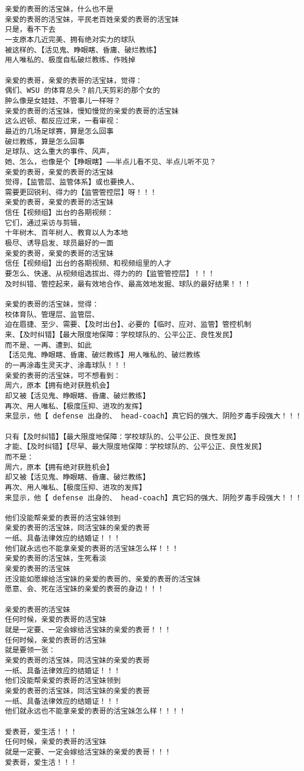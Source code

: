 \documentclass[9pt, b5paper]{article}
\begin{document}
\begin{verbatim}
亲爱的表哥的活宝妹，什么也不是
亲爱的表哥的活宝妹，平民老百姓亲爱的表哥的活宝妹
只是，看不下去
一支原本几近完美、拥有绝对实力的球队
被这样的、【活见鬼、睁眼瞎、昏庸、破烂教练】
用人唯私的、极度自私破烂教练、作贱掉

亲爱的表哥，亲爱的表哥的活宝妹，觉得：
偶们、WSU 的体育总头？前几天剪彩的那个女的
肿么像是女娃娃、不管事儿一样呀？
亲爱的表哥的活宝妹，慢知慢觉的亲爱的表哥的活宝妹
这么迟顿、都反应过来，一看审视：
最近的几场足球赛，算是怎么回事
破烂教练，算是怎么回事
足球队、这么重大的事件、风声，
她、怎么，也像是个【睁眼瞎】——半点儿看不见、半点儿听不见？
亲爱的表哥，亲爱的表哥的活宝妹
觉得，【监管层、监管体系】或也要换人、
需要更回锐利、得力的【监管管控层】呀！！！
亲爱的表哥，亲爱的表哥的活宝妹
信任【视频组】出台的各期视频：
它们，通过采访与剪辑，
十年树木、百年树人、教育以人为本地
极尽、诱导启发、球员最好的一面
亲爱的表哥，亲爱的表哥的活宝妹
信任【视频组】出台的各期视频、和视频组里的人才
要怎么、快速、从视频组选拔出、得力的的【监管管控层】！！！
及时纠错、管控起来，最有效地合作、最高效地发掘、球队的最好结果！！！

亲爱的表哥的活宝妹，觉得：
校体育队、管理层、监管层、
迫在眉捷、至少、需要、【及时出台】、必要的【临时、应对、监管】管控机制
来、【及时纠错】【最大限度地保障：学校球队的、公平公正、良性发民】
而不是、一再、遭到、如此
【活见鬼、睁眼瞎、昏庸、破烂教练】用人唯私的、破烂教练
的一再涂毒生灵天才、涂毒球队！！！
亲爱的表哥的活宝妹，可不想看到：
周六，原本【拥有绝对获胜机会】
却又被【活见鬼、睁眼瞎、昏庸、破烂教练】
再次、用人唯私、【极度压抑、进攻的发挥】
来显示，他【 defense 出身的、 head-coach】真它妈的强大、阴险歹毒手段强大！！！

只有【及时纠错】【最大限度地保障：学校球队的、公平公正、良性发民】
才能、【及时纠错】【尽早、最大限度地保障：学校球队的、公平公正、良性发民】
而不是：
周六，原本【拥有绝对获胜机会】
却又被【活见鬼、睁眼瞎、昏庸、破烂教练】
再次、用人唯私、【极度压抑、进攻的发挥】
来显示，他【 defense 出身的、 head-coach】真它妈的强大、阴险歹毒手段强大！！！

他们没能帮亲爱的表哥的活宝妹领到
亲爱的表哥的活宝妹，同活宝妹的亲爱的表哥
一纸、具备法律效应的结婚证！！！
他们就永远也不能拿亲爱的表哥的活宝妹怎么样！！！
亲爱的表哥的活宝妹，生死看淡
亲爱的表哥的活宝妹
还没能如愿嫁给活宝妹的亲爱的表哥的、亲爱的表哥的活宝妹
愿意、会、死在活宝妹的亲爱的表哥的身边！！！

亲爱的表哥的活宝妹
任何时候，亲爱的表哥的活宝妹
就是一定要、一定会嫁给活宝妹的亲爱的表哥！！！
任何时候，亲爱的表哥的活宝妹
就是要领一张：
亲爱的表哥的活宝妹，同活宝妹的亲爱的表哥
一纸、具备法律效应的结婚证！！！
他们没能帮亲爱的表哥的活宝妹领到
亲爱的表哥的活宝妹，同活宝妹的亲爱的表哥
一纸、具备法律效应的结婚证！！！
他们就永远也不能拿亲爱的表哥的活宝妹怎么样！！！！

爱表哥，爱生活！！！
任何时候，亲爱的表哥的活宝妹
就是一定要、一定会嫁给活宝妹的亲爱的表哥！！！
爱表哥，爱生活！！！
\end{verbatim}
\end{document}

